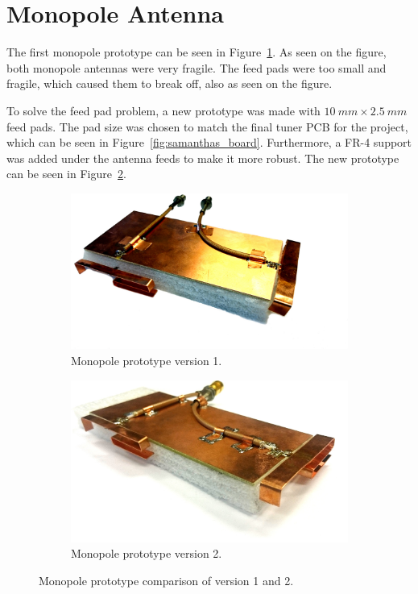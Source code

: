 \section{Monopole Antenna}
The first monopole prototype can be seen in Figure~\ref{fig:ant1_proto1_3d}. As seen on the figure, both monopole antennas were very fragile. The feed pads were too small and fragile, which caused them to break off, also as seen on the figure.

To solve the feed pad problem, a new prototype was made with $\SI{10}{mm}\times \SI{2.5}{mm}$ feed pads. The pad size was chosen to match the final tuner PCB for the project, which can be seen in Figure~\ref{fig:samanthas_board}. Furthermore, a FR-4 support was added under the antenna feeds to make it more robust. The new prototype can be seen in Figure~\ref{fig:ant1_proto2_3d}.

\begin{figure}[htbp]
  \begin{subfigure}[b]{0.49\linewidth}
        \centering
        \includegraphics[scale=0.2]{img/tech_sol/monopole/prototype_v1/monopole_v1}
        \caption{Monopole prototype version 1.}
        \label{fig:ant1_proto1_3d}
    \end{subfigure}
    \hfill
    \begin{subfigure}[b]{0.49\linewidth}
        \centering
        \includegraphics[scale=0.27]{img/tech_sol/monopole/prototype_v2/monopole_v2}
        \caption{Monopole prototype version 2.}
        \label{fig:ant1_proto2_3d}
    \end{subfigure}
    \caption{Monopole prototype comparison of version 1 and 2.}
    \label{fig:ant_1_proto_3d}
\end{figure}

